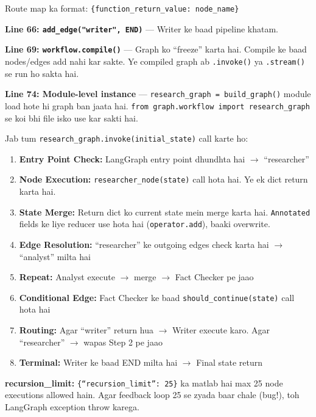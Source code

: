 \documentclass[12pt, a4paper]{article}
\begin{document}
\begin{codestorybox}
Route map ka format: \texttt{\{function\_return\_value: node\_name\}}

\textbf{Line 66: \texttt{add\_edge("writer", END)}} --- Writer ke baad pipeline khatam.

\textbf{Line 69: \texttt{workflow.compile()}} --- Graph ko ``freeze'' karta hai. Compile ke baad nodes/edges add nahi kar sakte. Ye compiled graph ab \texttt{.invoke()} ya \texttt{.stream()} se run ho sakta hai.

\textbf{Line 74: Module-level instance} --- \texttt{research\_graph = build\_graph()} module load hote hi graph ban jaata hai. \texttt{from graph.workflow import research\_graph} se koi bhi file isko use kar sakti hai.
\end{codestorybox}

\begin{conceptbox}[title={\faIcon{brain} ~LangGraph Internals --- How the Engine Works}]
Jab tum \texttt{research\_graph.invoke(initial\_state)} call karte ho:

\begin{enumerate}[label=\textcolor{accentpurple}{Step \arabic*:}]
\item \textbf{Entry Point Check:} LangGraph entry point dhundhta hai $\rightarrow$ ``researcher''
\item \textbf{Node Execution:} \texttt{researcher\_node(state)} call hota hai. Ye ek dict return karta hai.
\item \textbf{State Merge:} Return dict ko current state mein merge karta hai. \texttt{Annotated} fields ke liye reducer use hota hai (\texttt{operator.add}), baaki overwrite.
\item \textbf{Edge Resolution:} ``researcher'' ke outgoing edges check karta hai $\rightarrow$ ``analyst'' milta hai
\item \textbf{Repeat:} Analyst execute $\rightarrow$ merge $\rightarrow$ Fact Checker pe jaao
\item \textbf{Conditional Edge:} Fact Checker ke baad \texttt{should\_continue(state)} call hota hai
\item \textbf{Routing:} Agar ``writer'' return hua $\rightarrow$ Writer execute karo. Agar ``researcher'' $\rightarrow$ wapas Step 2 pe jaao
\item \textbf{Terminal:} Writer ke baad END milta hai $\rightarrow$ Final state return
\end{enumerate}

\textbf{recursion\_limit:} \texttt{\{``recursion\_limit'': 25\}} ka matlab hai max 25 node executions allowed hain. Agar feedback loop 25 se zyada baar chale (bug!), toh LangGraph exception throw karega.
\end{conceptbox}
\end{document}
